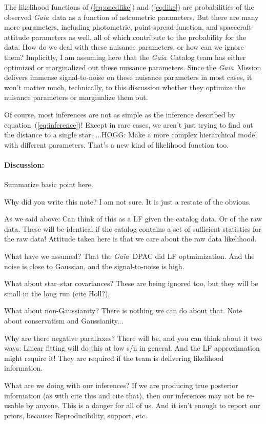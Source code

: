 \documentclass[12pt]{article}
\newcommand{\Gaia}{\textsl{Gaia}}
\newcommand{\equationname}{equation}
\begin{document}
The likelihood functions of (\ref{eq:onedlike}) and (\ref{eq:like}) are
probabilities of the observed \Gaia\ data as a
function of astrometric parameters.
But there are many more parameters, including photometric, point-spread-function,
and spacecraft-attitude parameters as well, all of which contribute to the probability
for the data.
How do we deal with these nuisance parameters, or how can we ignore them?
Implicitly, I am assuming here that the \Gaia\ Catalog team has either optimized
or marginalized out these nuisance parameters.
Since the \Gaia\ Mission delivers immense signal-to-noise on these nuisance
parameters in most cases, it won't matter much, technically, to this
discussion whether they optimize
the nuisance parameters or marginalize them out.

Of course, most inferences are not as simple as the inference described by
\equationname~(\ref{eq:inference})!
Except in rare cases, we aren't just trying to find out the distance to a single
star.
...HOGG: Make a more complex hierarchical model with different parameters. That's
a new kind of likelihood function too.

\paragraph{Discussion:}
Summarize basic point here.

Why did you write this note? I am not sure. It is just a restate of the
obvious.

As we said above: Can think of this as a LF given the catalog data. Or of the raw data.
These will be identical if the catalog contains a set of sufficient statistics
for the raw data!
Attitude taken here is that we care about the raw data likelihood.

What have we assumed? That the \Gaia\ DPAC did LF optmimization. And the
noise is close to Gaussian, and the signal-to-noise is high.

What about star--star covariances? These are being ignored too, but they
will be small in the long run (cite Holl?).

What about non-Gaussianity? There is nothing we can do about that.
Note about conservatism and Gaussianity...

Why are there negative parallaxes? There will be, and you can think about
it two ways: Linear fitting will do this at low s/n in general. And the
LF approximation might require it!
They are required if the team is delivering likelihood information.

What are we doing with our inferences? If we are producing true posterior
information (as with cite this and cite that), then our inferences may not
be re-usable by anyone. This is a danger for all of us. And it isn't enough
to report our priors, because: Reproducibility, support, etc.
\end{document}
